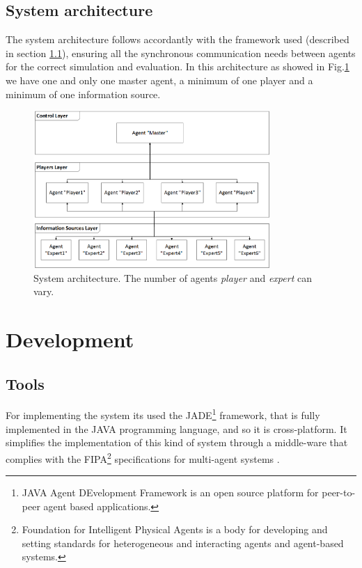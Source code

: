 \documentclass{llncs}
\begin{document}
\subsection{System architecture}\label{sec:Architecture}
The system architecture follows accordantly with the framework used (described in section \ref{sec:Tools}), ensuring all the synchronous communication needs between agents for the correct simulation and evaluation. In this architecture as showed in Fig.\ref{arch} we have one and only one master agent, a minimum of one player and a minimum of one information source. 

\begin{figure}
	\centering
    \includegraphics[width=0.8\textwidth]{arch.png}
    \caption{System architecture. The number of agents \textit{player} and \textit{expert} can vary.}
    \label{arch}
\end{figure}


\section{Development}\label{sec:Development}
\subsection{Tools}\label{sec:Tools}

For implementing the system its used the JADE\footnote{JAVA Agent DEvelopment Framework is an open source platform for peer-to-peer agent based applications.} framework, that is fully implemented in the JAVA programming language, and so it is cross-platform. It simplifies the implementation of this kind of system through a middle-ware that complies with the FIPA\footnote{ Foundation for Intelligent Physical Agents is a body for developing and setting standards for heterogeneous and interacting agents and agent-based systems.} specifications for multi-agent systems \cite{architecture}.
\end{document}
